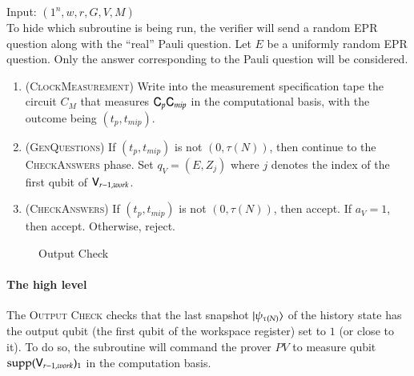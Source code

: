 \vspace{10pt}
\begin{center}
\begin{mdframed}
    Input: $(1^n,w,r,G,V,M)$ \\
To hide which subroutine is being run, the verifier will send a random EPR question along with the ``real'' Pauli question. Let $E$ be a uniformly random EPR question. Only the answer corresponding to the Pauli question will be considered.\\
	\begin{enumerate}
		\item (\textsc{ClockMeasurement}) Write into the measurement specification tape the circuit $C_M$ that measures ${\mathsf{C}}_p {\mathsf{C}}_{mip}$ in the computational basis, with the outcome being $(t_p,t_{mip})$.
		
		\item (\textsc{GenQuestions}) If $(t_p,t_{mip})$ is not $(0,\tau(N))$, then continue to the \textsc{CheckAnswers} phase. Set $q_V = (E,Z_j)$ where $j$ denotes the index of the first qubit of ${\mathsf{V}}_{r-1,work}$.
		\item (\textsc{CheckAnswers}) If $(t_p,t_{mip})$ is not $(0,\tau(N))$, then accept. If $a_V = 1$, then accept. Otherwise, reject.
	\end{enumerate}    
\end{mdframed}
\end{center}
\begin{figure}[H]
\caption{Output Check}
\label{fig:output_check}
\end{figure}


\paragraph{The high level} The \textsc{Output Check} checks that the last snapshot $|\psi_{\tau(N)}\rangle$ of the history state has the output qubit (the first qubit of the workspace register) set to $1$ (or close to it). To do so, the subroutine will command the prover $PV$ to measure  qubit $\operatorname{supp}({\mathsf{V}}_{r-1,work})_1$ in the computation basis. 



